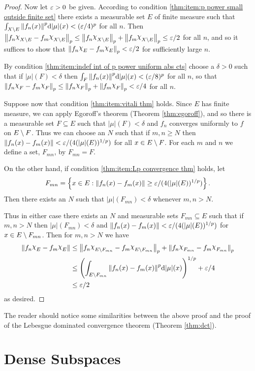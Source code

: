 \begin{proof}
Now let $\varepsilon>0$ be given. According to condition \ref{thm:item:p power small outside finite set} there exists a measurable set $E$ of finite measure such that $\int_{X\setminus E}\norm{f_n(x)}^p\dd|\mu|(x)<(\varepsilon/4)^p$ for all $n$. Then $\norm{f_n\idf{X\sd E}-f_m\idf{X\sd E}}_p\leq\norm{f_n\idf{X\sd E}}_p+\norm{f_m\idf{X\sd E}}_p\leq\ep/2$ for all $n$, and so it suffices to show that $\norm{f_n\idf{E}-f_m\idf{E}}_p<\varepsilon/2$ for sufficiently large $n$.

By condition \ref{thm:item:indef int of p power uniform abs cts} choose a $\delta>0$ such that if $|\mu|(F)<\delta$ then $\int_F\norm{f_n(x)}^p\dd|\mu|(x)<(\varepsilon/8)^p$ for all $n$, so that
$\norm{f_n\idf{F}-f_m\idf{F}}_p\leq\norm{f_n\idf{F}}_p+\norm{f_m\idf{F}}_p<\ep/4$ for all $n$.

Suppose now that condition \ref{thm:item:vitali thm} holds. Since $E$ has finite measure, we can apply Egoroff's theorem (Theorem \ref{thm:egoroff}), and so there is a measurable set $F\subseteq E$ such that $|\mu|(F)<\delta$ and $f_n$ converges uniformly to $f$ on $E\setminus F$. Thus we can choose an $N$ such that if $m,n\geq N$ then $\norm{f_n(x)-f_m(x)}<\varepsilon/(4(|\mu|(E))^{1/p})$ for all $x\in E\setminus F$. For each $m$ and $n$ we define a set, $F_{mn}$, by $F_{mn}=F$.

On the other hand, if condition \ref{thm:item:Lp convergence thm} holds, let $$F_{mn}=\left\{x\in E:\norm{f_n(x)-f_m(x)}\geq\varepsilon/(4(|\mu|(E))^{1/p})\right\}.$$ Then there exists an $N$ such that $|\mu|(F_{mn})<\delta$ whenever $m, n>N$.

Thus in either case there exists an $N$ and measurable sets $F_{mn}\subseteq E$ such that if $m,n>N$ then $|\mu|(F_{mn})<\delta$ and $\norm{f_n(x)-f_m(x)}<\varepsilon/(4(|\mu|(E))^{1/p})$ for $x\in E\setminus F_{mn}$. Then for $m, n>N$ we have
\begin{align*}
    \norm{f_n\idf{E}-f_m\idf{E}}&\leq\norm{f_n\idf{E\sd F_{mn}}-f_m\idf{E\sd F_{mn}}}_p+\norm{f_n\idf{F_{mn}}-f_m\idf{F_{mn}}}_p\\
    &\leq\br{\int_{E\sd F_{mn}}\norm{f_n(x)-f_m(x)}^p\dd|\mu|(x)}^{1/p}+\ep/4\\
    &\leq\ep/2
\end{align*}
as desired.
\end{proof}

The reader should notice some similarities between the above proof and the proof of the Lebesgue dominated convergence theorem (Theorem \ref{thm:dct}).

\section{Dense Subspaces}

